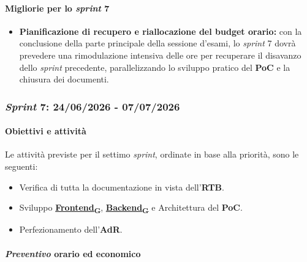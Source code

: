 \documentclass[12pt, a4paper]{article}
\newcommand{\urlglossario}{https://skynetunigroup.github.io/Code_Guardian/Documentazione/RTB/glossario_v1.0.0.pdf} %
\newcommand{\glo}[2]{\href{\urlglossario\#nameddest=#2}{#1\textsubscript{G}}}
\begin{document}
{\paragraph{Migliorie per lo \textit{sprint} 7}
\begin{itemize}
    \item \textbf{Pianificazione di recupero e riallocazione del budget orario:} con la conclusione della parte principale della sessione d'esami, lo \textit{sprint} 7 dovrà prevedere una rimodulazione intensiva delle ore per recuperare il disavanzo dello \textit{sprint} precedente, parallelizzando lo sviluppo pratico del \textbf{PoC} e la chiusura dei documenti.
\end{itemize}

\subsubsection{\textit{Sprint} 7: 24/06/2026 - 07/07/2026}

\paragraph{Obiettivi e attività}

Le attività previste per il settimo \textit{sprint}, ordinate in base alla priorità, sono le seguenti:

\begin{itemize}
    \item  Verifica di tutta la documentazione in vista dell'\textbf{RTB}.
    \item Sviluppo \textbf{\glo{Frontend}{frontend}}, \textbf{\glo{Backend}{backend}} e Architettura del \textbf{PoC}.
    \item Perfezionamento dell'\textbf{AdR}.
\end{itemize}

\paragraph{\textit{Preventivo} orario ed economico}

}
\end{document}
